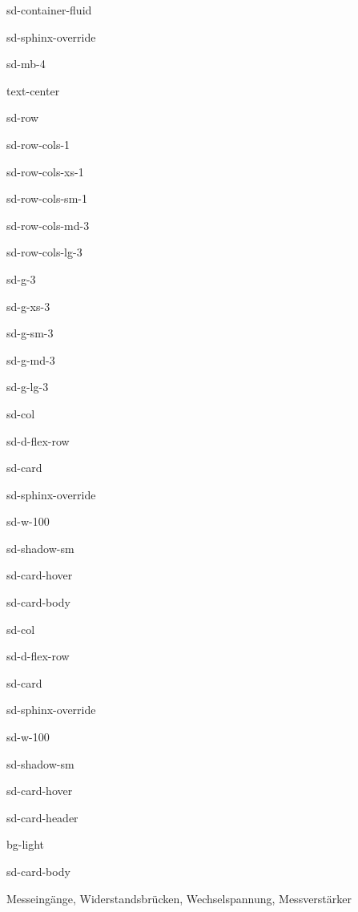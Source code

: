 \documentclass[letterpaper,10pt,english]{jupyterBook}
\let\sphinxpxdimen\pdfpxdimen\else\newdimen\sphinxpxdimen
\begin{document}
\begin{sphinxuseclass}{sd-container-fluid}
\begin{sphinxuseclass}{sd-sphinx-override}
\begin{sphinxuseclass}{sd-mb-4}
\begin{sphinxuseclass}{text-center}
\begin{sphinxuseclass}{sd-row}
\begin{sphinxuseclass}{sd-row-cols-1}
\begin{sphinxuseclass}{sd-row-cols-xs-1}
\begin{sphinxuseclass}{sd-row-cols-sm-1}
\begin{sphinxuseclass}{sd-row-cols-md-3}
\begin{sphinxuseclass}{sd-row-cols-lg-3}
\begin{sphinxuseclass}{sd-g-3}
\begin{sphinxuseclass}{sd-g-xs-3}
\begin{sphinxuseclass}{sd-g-sm-3}
\begin{sphinxuseclass}{sd-g-md-3}
\begin{sphinxuseclass}{sd-g-lg-3}
\begin{sphinxuseclass}{sd-col}
\begin{sphinxuseclass}{sd-d-flex-row}
\begin{sphinxuseclass}{sd-card}
\begin{sphinxuseclass}{sd-sphinx-override}
\begin{sphinxuseclass}{sd-w-100}
\begin{sphinxuseclass}{sd-shadow-sm}
\begin{sphinxuseclass}{sd-card-hover}
\begin{sphinxuseclass}{sd-card-body}
\end{sphinxuseclass}{\hyperref[\detokenize{content/5_Dynamische_Messsysteme::doc}]{}}
\end{sphinxuseclass}
\end{sphinxuseclass}
\end{sphinxuseclass}
\end{sphinxuseclass}
\end{sphinxuseclass}
\end{sphinxuseclass}
\end{sphinxuseclass}
\begin{sphinxuseclass}{sd-col}
\begin{sphinxuseclass}{sd-d-flex-row}
\begin{sphinxuseclass}{sd-card}
\begin{sphinxuseclass}{sd-sphinx-override}
\begin{sphinxuseclass}{sd-w-100}
\begin{sphinxuseclass}{sd-shadow-sm}
\begin{sphinxuseclass}{sd-card-hover}
\begin{sphinxuseclass}{sd-card-header}
\begin{sphinxuseclass}{bg-light}
\sphinxAtStartPar
{}

\end{sphinxuseclass}
\end{sphinxuseclass}
\begin{sphinxuseclass}{sd-card-body}
\noindent\sphinxincludegraphics[height=120\sphinxpxdimen]{{bandpass}.png}

\sphinxAtStartPar
Messeingänge, Widerstandsbrücken, Wechselspannung, Messverstärker


\end{sphinxuseclass}
\end{sphinxuseclass}
\end{sphinxuseclass}
\end{sphinxuseclass}
\end{sphinxuseclass}
\end{sphinxuseclass}
\end{sphinxuseclass}
\end{sphinxuseclass}
\end{sphinxuseclass}
\end{sphinxuseclass}
\end{sphinxuseclass}
\end{sphinxuseclass}
\end{sphinxuseclass}
\end{sphinxuseclass}
\end{sphinxuseclass}
\end{sphinxuseclass}
\end{sphinxuseclass}
\end{sphinxuseclass}
\end{sphinxuseclass}
\end{sphinxuseclass}
\end{sphinxuseclass}
\end{sphinxuseclass}
\end{sphinxuseclass}
\end{document}
